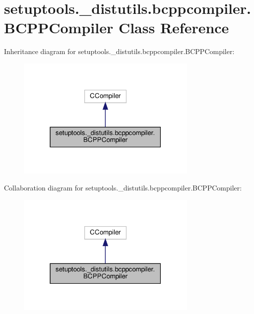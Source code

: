 \hypertarget{classsetuptools_1_1__distutils_1_1bcppcompiler_1_1BCPPCompiler}{}\section{setuptools.\+\_\+distutils.\+bcppcompiler.\+B\+C\+P\+P\+Compiler Class Reference}
\label{classsetuptools_1_1__distutils_1_1bcppcompiler_1_1BCPPCompiler}


Inheritance diagram for setuptools.\+\_\+distutils.\+bcppcompiler.\+B\+C\+P\+P\+Compiler\+:
\nopagebreak
\begin{figure}[H]
\begin{center}
\leavevmode
\includegraphics[width=247pt]{classsetuptools_1_1__distutils_1_1bcppcompiler_1_1BCPPCompiler__inherit__graph}
\end{center}
\end{figure}


Collaboration diagram for setuptools.\+\_\+distutils.\+bcppcompiler.\+B\+C\+P\+P\+Compiler\+:
\nopagebreak
\begin{figure}[H]
\begin{center}
\leavevmode
\includegraphics[width=247pt]{classsetuptools_1_1__distutils_1_1bcppcompiler_1_1BCPPCompiler__coll__graph}
\end{center}
\end{figure}
